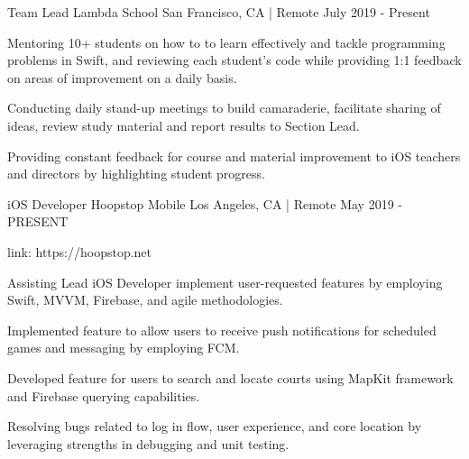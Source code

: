 

\begin{cventries}

  \cventry
    {Team Lead} %
    {Lambda School} %
    {San Francisco, CA | Remote} %
    {July 2019 - Present} %
    {
      \begin{cvitems} %
        \item {Mentoring 10+ students on how to to learn effectively and tackle programming problems in Swift, and reviewing each student's code while providing 1:1 feedback on areas of improvement on a daily basis.}
        \item {Conducting daily stand-up meetings to build camaraderie, facilitate sharing of ideas, review study material and report results to Section Lead.}
        \item {Providing constant feedback for course and material improvement to iOS teachers and directors by highlighting student progress.}
      \end{cvitems}
    }
    

  \cventry
    {iOS Developer} %
    {Hoopstop Mobile} %
    {Los Angeles, CA | Remote} %
    {May 2019 - PRESENT} %
    {
      \begin{cvitems} %
        \item {link: https://hoopstop.net}
        \item {Assisting Lead iOS Developer implement user-requested features by employing Swift, MVVM, Firebase, and agile methodologies.}
        \item {Implemented feature to allow users to receive push notifications for scheduled games and messaging by employing FCM.}
        \item {Developed feature for users to search and locate courts using MapKit framework and Firebase querying capabilities.}
        \item {Resolving bugs related to log in flow, user experience, and core location by leveraging strengths in debugging and unit testing.}
      \end{cvitems}
    }


\end{cventries}
